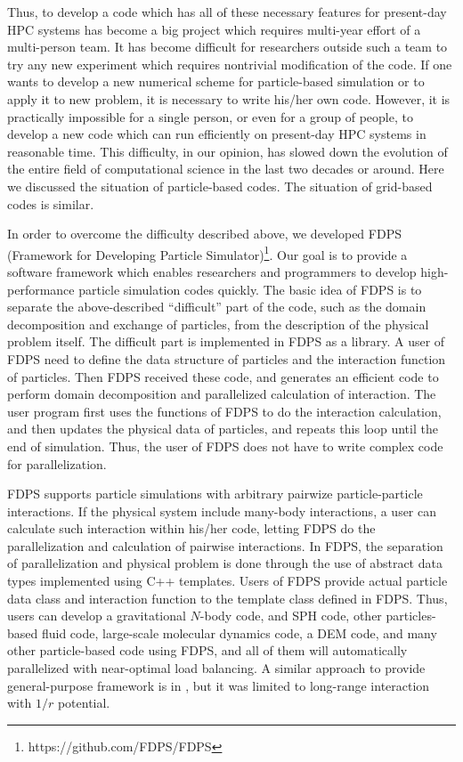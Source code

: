Thus, to develop a code which has all of these necessary features for
present-day HPC systems has become a big project which requires
multi-year effort of a multi-person team. It has become difficult for
researchers outside such a team to try any new experiment which
requires nontrivial modification of the code. If one wants to develop
a new numerical scheme for particle-based simulation or to apply it to
new problem, it is necessary to write his/her own code. However, it is
practically impossible for a single person, or even for a group of
people, to develop a new code which can run efficiently on present-day
HPC systems in reasonable time.  This difficulty, in our opinion, has
slowed down the evolution of the entire field of computational science
in the last two decades or around. Here we discussed the situation of
particle-based codes. The situation of grid-based codes is similar. 


In order to overcome the difficulty described above, we developed FDPS
(Framework for Developing Particle
Simulator)\footnote{https://github.com/FDPS/FDPS}. Our goal is to
provide a software framework which enables researchers and programmers
to develop high-performance particle simulation codes quickly. The
basic idea of FDPS is to separate the above-described ``difficult''
part of the code, such as the domain decomposition and exchange of
particles, from the description of the physical problem itself. The
difficult part is implemented in FDPS as a library. A user of FDPS
need to define the data structure of particles and the interaction
function of particles. Then FDPS received these code, and generates an
efficient code to perform domain decomposition and parallelized
calculation of interaction. The user program first uses the functions
of FDPS to do the interaction calculation, and then updates the
physical data of particles, and repeats this loop until the end of
simulation.  Thus, the user of FDPS does not have to write complex
code for parallelization.


FDPS supports particle simulations with arbitrary pairwize
particle-particle interactions. If the physical system include
many-body interactions, a user can calculate such interaction within
his/her code, letting FDPS do the parallelization and calculation of
pairwise interactions.  In FDPS, the separation of parallelization and
physical problem is done through the use of abstract data types
implemented using C++ templates. Users of FDPS provide actual particle
data class and interaction function to the template class defined in
FDPS. Thus, users can develop a gravitational $N$-body code, and SPH
code, other particles-based fluid code, large-scale molecular dynamics
code, a DEM code, and many other particle-based code using FDPS, and
all of them will automatically parallelized with near-optimal load
balancing. A similar approach to provide general-purpose framework is
in \cite{1995CoPhC..87..266W}, but it was limited to long-range
interaction with $1/r$ potential.


